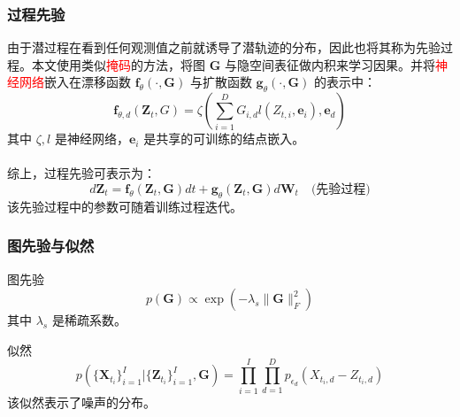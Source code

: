 \documentclass{beamer}
\begin{document}
\begin{frame}
\frametitle{过程先验}
由于潜过程在看到任何观测值之前就诱导了潜轨迹的分布，因此也将其称为先验过程。本文使用类似\textcolor{red}{掩码}的方法，将图 $\boldsymbol G$ 与隐空间表征做内积来学习因果。并将\textcolor{red}{神经网络}嵌入在漂移函数 $\boldsymbol f_\theta (\cdot,\boldsymbol G)$ 与扩散函数 $\boldsymbol g_\theta (\cdot,\boldsymbol G)$ 的表示中：
\begin{equation}
    \boldsymbol f_{\theta,d}(\boldsymbol Z_t, G)=\zeta\left(\sum_{i=1}^DG_{i,d}l(Z_{t,i},\boldsymbol e_i),\boldsymbol e_d\right)
\end{equation}
其中 $\zeta,l$ 是神经网络，$\boldsymbol e_i$ 是共享的可训练的结点嵌入。
\\~\\
综上，过程先验可表示为：
\begin{equation}
    d\boldsymbol Z_t=\boldsymbol f_\theta(\boldsymbol Z_t,\boldsymbol G)dt+\boldsymbol g_\theta(\boldsymbol Z_t,\boldsymbol G)d\boldsymbol W_t\quad\text{(先验过程)}
\end{equation}
该先验过程中的参数可随着训练过程迭代。
\end{frame}
\begin{frame}
\frametitle{图先验与似然}
\begin{block}{图先验}
    \begin{equation}
        p(\boldsymbol G)\propto\exp(-\lambda_s\|\boldsymbol G\|_F^2)
    \end{equation}
    其中 $\lambda_s$ 是稀疏系数。
\end{block}
\begin{block}{似然}
    \begin{equation}
        p(\{\boldsymbol X_{t_{i}}\}_{i=1}^{I}|\{\boldsymbol Z_{t_{i}}\}_{i=1}^{I},\boldsymbol G)=\prod_{i=1}^{I}\prod_{d=1}^{D}p_{\epsilon_{d}}(X_{t_{i},d}-Z_{t_{i},d})
    \end{equation}
该似然表示了噪声的分布。
\end{block}
\end{frame}
\end{document}
